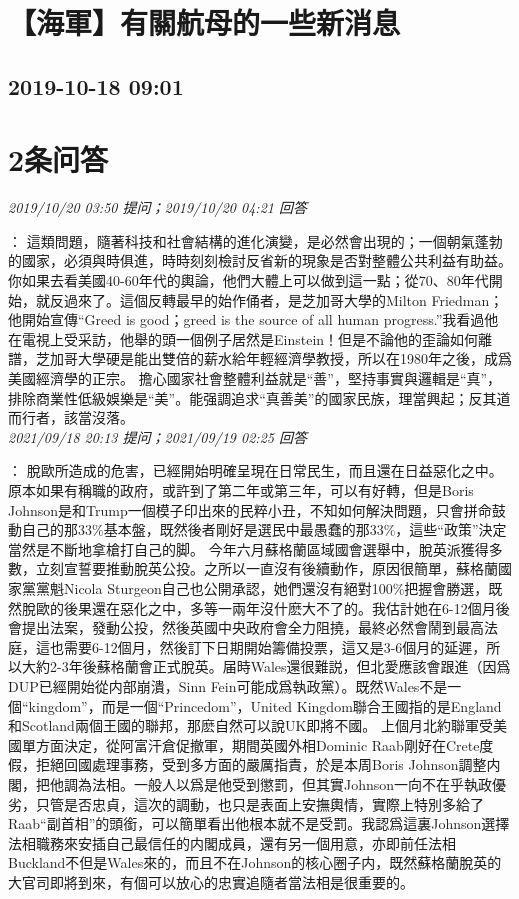 \documentclass[twocolumn]{ctexart}
\begin{document}
\section{【海軍】有關航母的一些新消息}
\subsection{2019-10-18 09:01}


\section{2条问答}

\textit{\hfill\noindent\small 2019/10/20 03:50 提问；2019/10/20 04:21 回答}

：
這類問題，隨著科技和社會結構的進化演變，是必然會出現的；一個朝氣蓬勃的國家，必須與時俱進，時時刻刻檢討反省新的現象是否對整體公共利益有助益。你如果去看美國40-60年代的輿論，他們大體上可以做到這一點；從70、80年代開始，就反過來了。這個反轉最早的始作俑者，是芝加哥大學的Milton Friedman；他開始宣傳“Greed is good；greed is the source of all human progress.”我看過他在電視上受采訪，他舉的頭一個例子居然是Einstein！但是不論他的歪論如何離譜，芝加哥大學硬是能出雙倍的薪水給年輕經濟學教授，所以在1980年之後，成爲美國經濟學的正宗。
擔心國家社會整體利益就是“善”，堅持事實與邏輯是“真”，排除商業性低級娛樂是“美”。能强調追求“真善美”的國家民族，理當興起；反其道而行者，該當沒落。
\\

\textit{\hfill\noindent\small 2021/09/18 20:13 提问；2021/09/19 02:25 回答}

：
脫歐所造成的危害，已經開始明確呈現在日常民生，而且還在日益惡化之中。原本如果有稱職的政府，或許到了第二年或第三年，可以有好轉，但是Boris Johnson是和Trump一個模子印出來的民粹小丑，不知如何解決問題，只會拼命鼓動自己的那33\%基本盤，既然後者剛好是選民中最愚蠢的那33\%，這些“政策”決定當然是不斷地拿槍打自己的脚。
今年六月蘇格蘭區域國會選舉中，脫英派獲得多數，立刻宣誓要推動脫英公投。之所以一直沒有後續動作，原因很簡單，蘇格蘭國家黨黨魁Nicola Sturgeon自己也公開承認，她們還沒有絕對100\%把握會勝選，既然脫歐的後果還在惡化之中，多等一兩年沒什麽大不了的。我估計她在6-12個月後會提出法案，發動公投，然後英國中央政府會全力阻撓，最終必然會鬧到最高法庭，這也需要6-12個月，然後訂下日期開始籌備投票，這又是3-6個月的延遲，所以大約2-3年後蘇格蘭會正式脫英。届時Wales還很難説，但北愛應該會跟進（因爲DUP已經開始從内部崩潰，Sinn Fein可能成爲執政黨）。既然Wales不是一個“kingdom”，而是一個“Princedom”，United Kingdom聯合王國指的是England和Scotland兩個王國的聯邦，那麽自然可以說UK即將不國。
上個月北約聯軍受美國單方面決定，從阿富汗倉促撤軍，期間英國外相Dominic Raab剛好在Crete度假，拒絕回國處理事務，受到多方面的嚴厲指責，於是本周Boris Johnson調整内閣，把他調為法相。一般人以爲是他受到懲罰，但其實Johnson一向不在乎執政優劣，只管是否忠貞，這次的調動，也只是表面上安撫輿情，實際上特別多給了Raab“副首相”的頭銜，可以簡單看出他根本就不是受罰。我認爲這裏Johnson選擇法相職務來安插自己最信任的内閣成員，還有另一個用意，亦即前任法相Buckland不但是Wales來的，而且不在Johnson的核心圈子内，既然蘇格蘭脫英的大官司即將到來，有個可以放心的忠實追隨者當法相是很重要的。
\\
\end{document}

